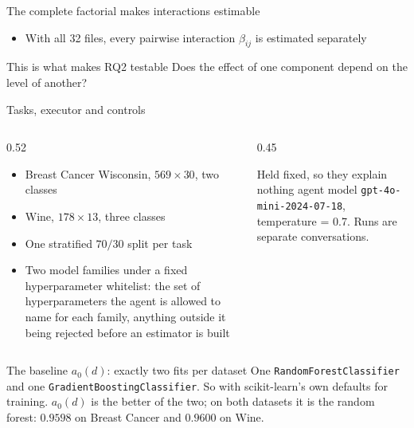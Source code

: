 \documentclass[aspectratio=169,11pt]{beamer}
\begin{document}
\begin{frame}{The complete factorial makes interactions estimable}
  \begin{itemize}
    \item With all 32 files, every pairwise interaction $\beta_{ij}$ is
          estimated separately 
  \end{itemize}
  \vfill
  \begin{block}{This is what makes RQ2 testable}
    Does the effect of one component depend on the level of another?
  \end{block}
\end{frame}

\begin{frame}{Tasks, executor and controls}
  \begin{columns}[T]
    \begin{column}{0.52\textwidth}
      \begin{itemize}
        \item Breast Cancer Wisconsin, $569\times30$, two classes
        \item Wine, $178\times13$, three classes
        \item One stratified $70/30$ split per task
        \item Two model families under a fixed hyperparameter whitelist: the
              set of hyperparameters the agent is allowed to name for each
              family, anything outside it being rejected before an estimator is
              built
      \end{itemize}
    \end{column}
    \begin{column}{0.45\textwidth}
      \begin{block}{Held fixed, so they explain nothing}
        \scriptsize
        agent model \texttt{gpt-4o-mini-2024-07-18}, temperature = 0.7. Runs are separate conversations.
      \end{block}
      \vspace{-0.15cm}
    \end{column}
  \end{columns}
  \vspace{-0.1cm}
  \begin{block}{The baseline $a_0(d)$: exactly two fits per dataset}
    \small
    One \texttt{RandomForestClassifier} and one \texttt{GradientBoostingClassifier}. So with
    scikit-learn's own defaults for training. $a_0(d)$ is the better of the two; on both datasets it is the random forest: $0.9598$ on Breast Cancer and $0.9600$ on Wine.
  \end{block}
\end{frame}
\end{document}
